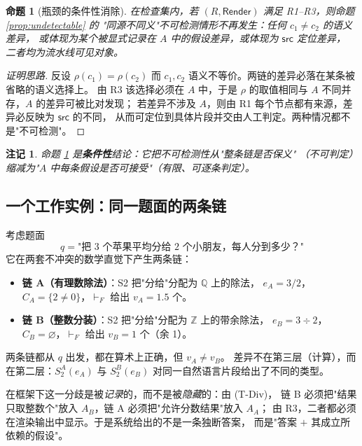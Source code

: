 \documentclass[11pt]{article}
\newtheorem{proposition}{命题}[section]
\newtheorem{remark}{注记}[section]
\begin{document}
\begin{proposition}[瓶颈的条件性消除]
\label{prop:conditional}
在检查集内，若 $(R,\mathsf{Render})$ 满足 R1--R3，则命题 \ref{prop:undetectable} 的
"同源不同义"不可检测情形不再发生：任何 $c_1 \neq c_2$ 的语义差异，
或体现为某个被显式记录在 $A$ 中的假设差异，或体现为 $\mathsf{src}$ 定位差异，
二者均为流水线可见对象。
\end{proposition}
\begin{proof}[证明思路]
反设 $\rho(c_1)=\rho(c_2)$ 而 $c_1,c_2$ 语义不等价。两链的差异必落在某条被省略的语义选择上。
由 R3 该选择必须在 $A$ 中，于是 $\rho$ 的取值相同与 $A$ 不同并存，$A$ 的差异可被比对发现；
若差异不涉及 $A$，则由 R1 每个节点都有来源，差异必反映为 $\mathsf{src}$ 的不同，
从而可定位到具体片段并交由人工判定。两种情况都不是"不可检测"。
\end{proof}

\begin{remark}
命题 \ref{prop:conditional} 是\textbf{条件性}结论：它把不可检测性从"整条链是否保义"
（不可判定）缩减为"$A$ 中每条假设是否可接受"（有限、可逐条判定）。
\end{remark}

\subsection{一个工作实例：同一题面的两条链}
\label{subsec:example}
考虑题面
\[
q = \text{"把 3 个苹果平均分给 2 个小朋友，每人分到多少？"}
\]
它在两套不冲突的数学直觉下产生两条链：

\begin{itemize}[leftmargin=1.6em,itemsep=2pt]
\item \textbf{链 A（有理数除法）}：S2 把"分给"分配为 $\mathbb{Q}$ 上的除法，
$e_A = 3/2$，$C_A=\{2 \neq 0\}$，$\vdash_F$ 给出 $v_A = 1.5$ 个。
\item \textbf{链 B（整数分装）}：S2 把"分给"分配为 $\mathbb{Z}$ 上的带余除法，
$e_B = 3 \div 2$，$C_B = \varnothing$，$\vdash_F$ 给出 $v_B = 1$ 个（余 1）。
\end{itemize}

两条链都从 $q$ 出发，都在算术上正确，但 $v_A \neq v_B$。
差异不在第三层（计算），而在第二层：$S_2^A(e_A)$ 与 $S_2^B(e_B)$
对同一自然语言片段给出了不同的类型。

在框架下这一分歧是被\emph{记录}的，而不是被\emph{隐藏}的：由 (T-Div)，
链 B 必须把"结果只取整数个"放入 $A_B$，链 A 必须把"允许分数结果"放入 $A_A$；
由 R3，二者都必须在渲染输出中显示。于是系统给出的不是一条独断答案，
而是"答案 $+$ 其成立所依赖的假设"。
\end{document}
